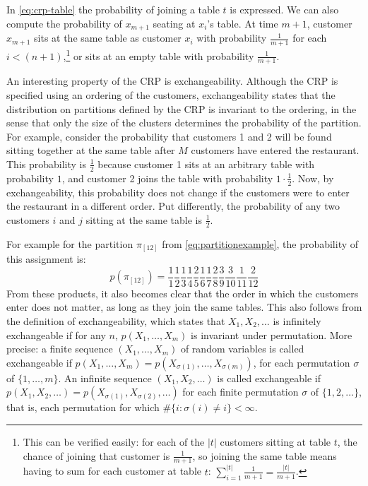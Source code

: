 In \cref{eq:crp-table} the probability of joining a table $t$ is expressed. We can also compute the probability of $x_{m+1}$ seating at $x_i$'s table. At time $m+1$, customer $x_{m+1}$ sits at the same table as customer $x_i$ with probability $\frac{1}{m+1}$ for each $i<(n+1)$,\footnote{This can be verified easily: for each of the $|t|$ customers sitting at table $t$, the chance of joining that customer is $\frac{1}{m+1}$, so joining the same table means having to sum for each customer at table $t$: $\sum_{i=1}^{|t|} \frac{1}{m+1} = \frac{|t|}{m+1}$.} or sits at an empty table with probability $\frac{1}{m+1}$. 

An interesting property of the CRP is exchangeability. Although the CRP is specified using an ordering of the customers, exchangeability states that the distribution on partitions defined by the CRP is invariant to the ordering, in the sense that only the size of the clusters determines the probability of the partition. For example, consider the probability that customers 1 and 2 will be found sitting together at the same table after $M$ customers have entered the restaurant. This probability is $\frac{1}{2}$ because customer 1 sits at an arbitrary table with probability $1$, and customer 2 joins the table with probability $1\cdot\frac{1}{2}$. Now, by exchangeability, this probability does not change if the customers were to enter the restaurant in a different order. Put differently, the probability of any two customers $i$ and $j$ sitting at the same table is $\frac{1}{2}$.
%
%

For example for the partition $\pi_{[12]}$ from \cref{eq:partitionexample}, the probability of this assignment is:
\begin{equation}\label{eq:partitionexampleprobability}
	p(\pi_{[12]}) = \frac{1}{1}\frac{1}{2}\frac{1}{3}\frac{1}{4}\frac{2}{5}\frac{1}{6}\frac{1}{7}\frac{2}{8}\frac{3}{9}\frac{3}{10}\frac{1}{11}\frac{2}{12}
\end{equation}
From these products, it also becomes clear that the order in which the customers enter does not matter, as long as they join the same tables. This also follows from the definition of exchangeability, which states that $X_1, X_2, \ldots$ is infinitely exchangeable if for any $n$, $p(X_1,\ldots,X_m)$ is invariant under permutation. More precise: a finite sequence $(X_1, \ldots, X_m)$ of random variables is called exchangeable if $p(X_1,\ldots,X_m) = p(X_{\sigma(1)},\ldots,X_{\sigma(m)})$, for each permutation $\sigma$ of $\{1,\ldots,m\}$. An infinite sequence $(X_1,X_2,\ldots)$ is called exchangeable if $p(X_1,X_2,\ldots)=p(X_{\sigma(1)},X_{\sigma(2)},\ldots)$ for each finite permutation $\sigma$ of $\{1,2,\ldots\}$, that is, each permutation for which $\#\{i: \sigma(i)\neq i\} < \infty$.

